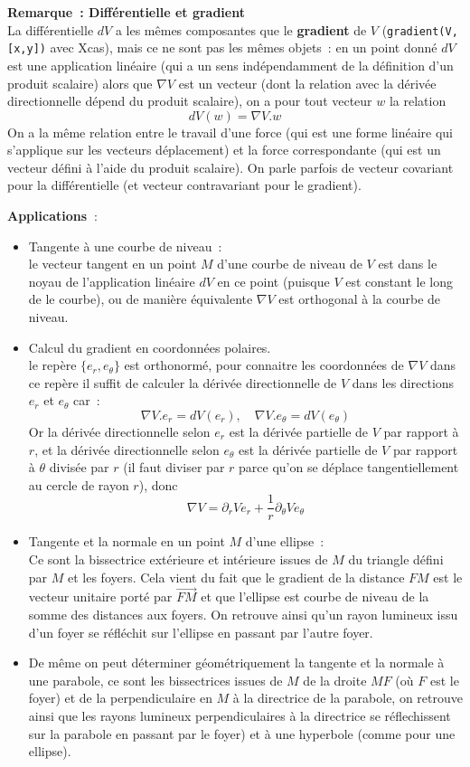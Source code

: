 \documentclass[a4paper,11pt]{article}
\begin{document}
\begin{giacjshere}
{\bf Remarque~: Diff\'erentielle et gradient}\\
La diff\'erentielle $dV$ a les m\^emes composantes que
le {\bf gradient} de $V$ (\verb|gradient(V,[x,y])| avec Xcas), 
mais ce ne sont pas les m\^emes objets~: 
en un point donn\'e
$dV$ est une application lin\'eaire (qui a un sens ind\'ependamment
de la d\'efinition d'un produit scalaire)
alors que $\nabla V$ est un vecteur (dont la relation
avec la d\'eriv\'ee directionnelle d\'epend du produit scalaire), 
on a pour tout vecteur $w$ la relation 
$$dV(w)=\nabla V. w $$
On a la m\^eme relation entre le travail d'une force (qui est une
forme lin\'eaire qui s'applique sur les vecteurs d\'eplacement) 
et la force correspondante (qui est un vecteur
d\'efini \`a l'aide du produit scalaire). On parle parfois de vecteur
covariant pour la diff\'erentielle (et vecteur contravariant pour le
gradient).

{\bf Applications~}: 
\begin{itemize}
\item
Tangente \`a une courbe de niveau~:\\
le vecteur tangent en un point $M$ d'une courbe de niveau de $V$
est dans le noyau de l'application lin\'eaire $dV$ en ce point
(puisque $V$ est constant le long de le courbe), ou de
mani\`ere \'equivalente $\nabla V$ est orthogonal \`a la
courbe de niveau.
\item
Calcul du gradient en coordonn\'ees polaires.\\
le rep\`ere $\{e_r,e_\theta \}$ est orthonorm\'e, pour
connaitre les coordonn\'ees de $\nabla V$ dans ce rep\`ere
il suffit de calculer la d\'eriv\'ee directionnelle de $V$
dans les directions $e_r$ et $e_\theta$ car~: 
$$ \nabla V. e_r = dV(e_r), \quad \nabla V.e_\theta=dV(e_\theta)$$ 
Or la d\'eriv\'ee directionnelle selon $e_r$ est
la d\'eriv\'ee partielle de $V$ par rapport \`a $r$, et la d\'eriv\'ee
directionnelle selon $e_\theta$ est la d\'eriv\'ee partielle de $V$
par rapport \`a $\theta$ divis\'ee par $r$ (il faut diviser par $r$
parce qu'on se d\'eplace tangentiellement au cercle de rayon $r$), donc
$$ \nabla V = \partial_r V e_r + \frac1r \partial_\theta V e_\theta$$
\item 
Tangente et la normale en un point $M$ d'une ellipse~:\\
Ce sont la bissectrice ext\'erieure et int\'erieure issues de $M$ 
du triangle d\'efini par $M$ et les foyers. 
Cela vient du fait que le gradient de la
distance $FM$ est le vecteur unitaire port\'e par
$\overrightarrow{FM}$
et que l'ellipse est courbe de niveau de la somme des distances aux
foyers. On retrouve ainsi qu'un rayon lumineux issu d'un foyer
se r\'efl\'echit sur l'ellipse en passant par l'autre foyer.
\item De m\^eme on peut d\'eterminer g\'eom\'etriquement la
tangente et la normale \`a une parabole,
ce sont les bissectrices issues de $M$ 
de la droite $MF$ (o\`u $F$ est le foyer) et de la
perpendiculaire en $M$ \`a la directrice de la parabole,
on retrouve ainsi que les rayons lumineux perpendiculaires
\`a la directrice se r\'eflechissent sur la parabole en passant
par le foyer) et \`a une hyperbole (comme pour une ellipse).
\end{itemize}


\end{giacjshere}
\end{document}
